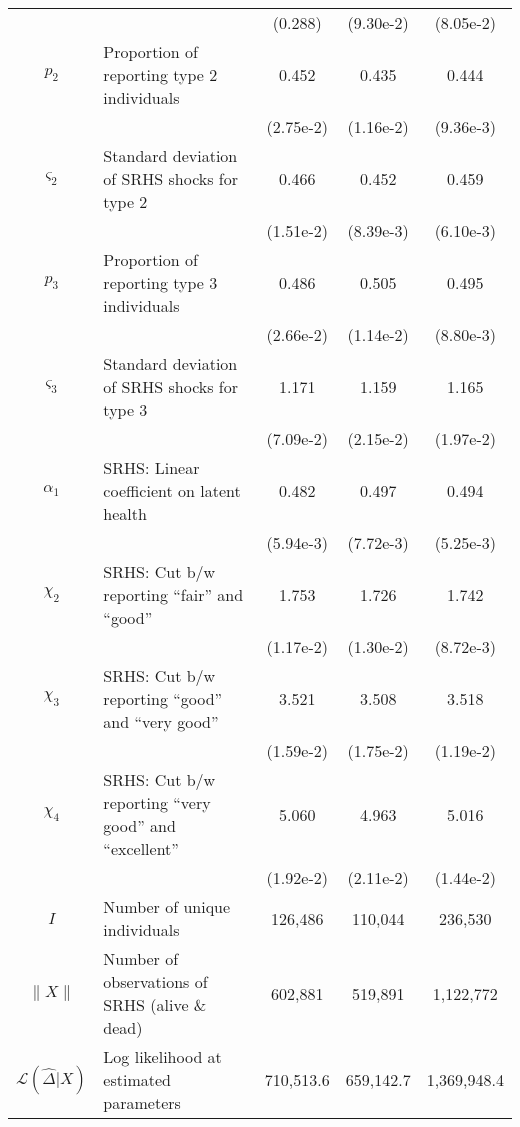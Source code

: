 \begin{table}
\begin{center}
{\begin{tabular}{clccc}
\rule{0pt}{2.2ex} & & (0.288) & (9.30e-2) & (8.05e-2) \\
\rule{0pt}{2.2ex}$p_2$ & Proportion of reporting type 2 individuals & 0.452 & 0.435 & 0.444 \\
\rule{0pt}{2.2ex} & & (2.75e-2) & (1.16e-2) & (9.36e-3) \\
\rule{0pt}{2.2ex}$\varsigma_2$ & Standard deviation of SRHS shocks for type 2 & 0.466 & 0.452 & 0.459 \\
\rule{0pt}{2.2ex} & & (1.51e-2) & (8.39e-3) & (6.10e-3) \\
\rule{0pt}{2.2ex}$p_3$ & Proportion of reporting type 3 individuals & 0.486 & 0.505 & 0.495 \\
\rule{0pt}{2.2ex} & & (2.66e-2) & (1.14e-2) & (8.80e-3) \\
\rule{0pt}{2.2ex}$\varsigma_3$ & Standard deviation of SRHS shocks for type 3 & 1.171 & 1.159 & 1.165 \\
\rule{0pt}{2.2ex} & & (7.09e-2) & (2.15e-2) & (1.97e-2) \\
\hline
\rule{0pt}{2.2ex}$\alpha_1$ & SRHS: Linear coefficient on latent health & 0.482 & 0.497 & 0.494 \\
\rule{0pt}{2.2ex} & & (5.94e-3) & (7.72e-3) & (5.25e-3) \\
\rule{0pt}{2.2ex}$\chi_2$ & SRHS: Cut b/w reporting ``fair'' and ``good'' & 1.753 & 1.726 & 1.742 \\
\rule{0pt}{2.2ex} & & (1.17e-2) & (1.30e-2) & (8.72e-3) \\
\rule{0pt}{2.2ex}$\chi_3$ & SRHS: Cut b/w reporting ``good'' and ``very good'' & 3.521 & 3.508 & 3.518 \\
\rule{0pt}{2.2ex} & & (1.59e-2) & (1.75e-2) & (1.19e-2) \\
\rule{0pt}{2.2ex}$\chi_4$ & SRHS: Cut b/w reporting ``very good'' and ``excellent'' & 5.060 & 4.963 & 5.016 \\
\rule{0pt}{2.2ex} & & (1.92e-2) & (2.11e-2) & (1.44e-2) \\
\hline
\rule{0pt}{2.2ex}$I$ & Number of unique individuals & 126,486 & 110,044 & 236,530\\
\rule{0pt}{2.2ex}$\lVert X \rVert$ & Number of observations of SRHS (alive \& dead) & 602,881 & 519,891 & 1,122,772\\
\rule{0pt}{2.2ex}$\mathcal{L}(\widehat{\Delta} | X)$ & Log likelihood at estimated parameters & 710,513.6 & 659,142.7 & 1,369,948.4\\
\hline\hline
\end{tabular}
 } 
\usebox{\MEPSonlyTableBox}  
\end{center}
\end{table}
